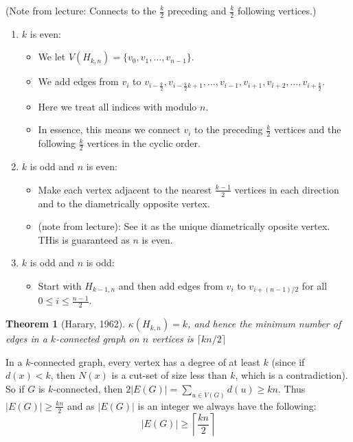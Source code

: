 \documentclass{Book}
\newtheorem{theorem}{Theorem}
\begin{document}
(Note from lecture: Connects to the $\frac{k}{2}$ preceding and $\frac{k}{2}$ following vertices.)
\begin{enumerate}
	\item $k$ is even:
	      \begin{itemize}
		      \item We let $V(H_{k,n}) = \{v_{0}, v_{1}, \ldots, v_{n-1}\}$.
		      \item We add edges from $v_{i}$ to $v_{i-\frac{k}{2}}, v_{i-\frac{k}{2}k+1}, \ldots, v_{i-1}, v_{i+1}, v_{i+2}, \ldots, v_{i+\frac{k}{2}}$.
		      \item Here we treat all indices with modulo $n$.
		      \item In essence, this means we connect $v_{i}$ to the preceding $\frac{k}{2}$ vertices and the following $\frac{k}{2}$ vertices in the cyclic order.
	      \end{itemize}
	\item $k$ is odd and $n$ is even:
	      \begin{itemize}
		      \item Make each vertex adjacent to the nearest $\frac{k-1}{2}$ vertices in each direction and to the diametrically opposite vertex.
		      \item (note from lecture): See it as the unique diametrically oposite vertex. THis is guaranteed as $n$ is even.
	      \end{itemize}
	\item $k$ is odd and $n$ is odd:
	      \begin{itemize}
		      \item Start with $H_{k-1,n}$ and then add edges from $v_{i}$ to $v_{i+(n-1)/2}$ for all $0 \le i \le \frac{n-1}{2}$.
	      \end{itemize}
\end{enumerate}

\begin{theorem}[Harary, 1962]
	\(\kappa(H_{k,n}) = k \), and hence the minimum number of edges in a $k$-connected graph on $n$ vertices is $\lceil kn / 2 \rceil$
\end{theorem}

In a $k$-connected graph, every vertex has a degree of at least $k$ (since if $d(x) < k$, then $N(x)$ is a cut-set of size less than $k$, which is a contradiction). So if $G$ is $k$-connected, then $2|E(G)| = \sum_{u \in V(G)} d(u) \ge kn$. Thus $|E(G)|\ge \frac{kn}{2}$ and as $|E(G)|$ is an integer we always have the following:
\begin{equation*}
	|E(G)| \ge \left \lceil \frac{kn}{2}  \right \rceil
\end{equation*}
\end{document}
